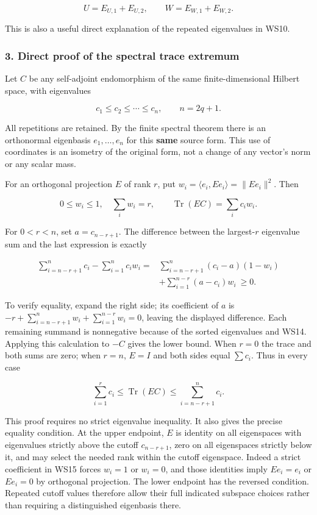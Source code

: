 \[
U=E_{U,1}+E_{U,2},\qquad
W=E_{W,1}+E_{W,2}.
\tag{WS12}
\]

This is also a useful direct explanation of the repeated eigenvalues in WS10.

\subsubsection{3. Direct proof of the spectral trace extremum}\label{endpoint-window_review--direct-proof-of-the-spectral-trace-extremum}

Let \(C\) be any self-adjoint endomorphism of the same finite-dimensional Hilbert space, with eigenvalues

\[
c_1\le c_2\le\cdots\le c_n,
\qquad n=2q+1.
\tag{WS13}
\]

All repetitions are retained. By the finite spectral theorem there is an orthonormal eigenbasis \(e_1,\ldots,e_n\) for this \textbf{same} source form. This use of coordinates is an isometry of the original form, not a change of any vector's norm or any scalar mass.

For an orthogonal projection \(E\) of rank \(r\), put \(w_i=\langle e_i,Ee_i\rangle=\|Ee_i\|^2\). Then

\[
0\le w_i\le1,\quad\sum_iw_i=r,
\qquad\operatorname{Tr}(EC)=\sum_i c_iw_i.
\tag{WS14}
\]

For \(0<r<n\), set \(a=c_{n-r+1}\). The difference between the largest-\(r\) eigenvalue sum and the last expression is exactly

\[
\begin{aligned}
\sum_{i=n-r+1}^n c_i-\sum_{i=1}^n c_iw_i
={}&\sum_{i=n-r+1}^n(c_i-a)(1-w_i)\\
&+\sum_{i=1}^{n-r}(a-c_i)w_i\ \ge0.
\end{aligned}
\tag{WS15}
\]

To verify equality, expand the right side; its coefficient of \(a\) is \(-r+\sum_{i=n-r+1}^nw_i+\sum_{i=1}^{n-r}w_i=0\), leaving the displayed difference. Each remaining summand is nonnegative because of the sorted eigenvalues and WS14. Applying this calculation to \(-C\) gives the lower bound. When \(r=0\) the trace and both sums are zero; when \(r=n\), \(E=I\) and both sides equal \(\sum c_i\). Thus in every case

\[
\sum_{i=1}^r c_i\le\operatorname{Tr}(EC)
\le\sum_{i=n-r+1}^{n}c_i.
\tag{WS16}
\]

This proof requires no strict eigenvalue inequality. It also gives the precise equality condition. At the upper endpoint, \(E\) is identity on all eigenspaces with eigenvalues strictly above the cutoff \(c_{n-r+1}\), zero on all eigenspaces strictly below it, and may select the needed rank within the cutoff eigenspace. Indeed a strict coefficient in WS15 forces \(w_i=1\) or \(w_i=0\), and those identities imply \(Ee_i=e_i\) or \(Ee_i=0\) by orthogonal projection. The lower endpoint has the reversed condition. Repeated cutoff values therefore allow their full indicated subspace choices rather than requiring a distinguished eigenbasis there.

